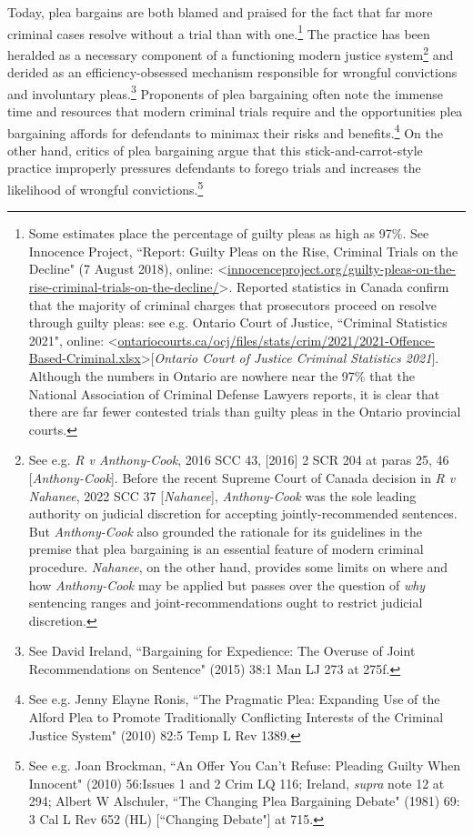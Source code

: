 Today, plea bargains are both blamed and praised for the fact that far more criminal cases resolve without a trial than with one.\footnote{Some estimates place the percentage of guilty pleas as high as 97\%. See Innocence Project, ``Report: Guilty Pleas on the Rise, Criminal Trials on the Decline" (7 August 2018), online: \textless \url{innocenceproject.org/guilty-pleas-on-the-rise-criminal-trials-on-the-decline/}\textgreater. Reported statistics in Canada confirm that the majority of criminal charges that prosecutors proceed on resolve through guilty pleas: see e.g. Ontario Court of Justice, ``Criminal Statistics 2021", online: \textless \url{ontariocourts.ca/ocj/files/stats/crim/2021/2021-Offence-Based-Criminal.xlsx}\textgreater \hspace{1mm}[\textit{Ontario Court of Justice Criminal Statistics 2021}]. Although the numbers in Ontario are nowhere near the 97\% that the National Association of Criminal Defense Lawyers reports, it is clear that there are far fewer contested trials than guilty pleas in the Ontario provincial courts.} The practice has been heralded as a necessary component of a functioning modern justice system\footnote{See e.g. \textit{R v Anthony-Cook}, 2016 SCC 43, [2016] 2 SCR 204 at paras 25, 46 [\textit{Anthony-Cook}]. Before the recent Supreme Court of Canada decision in \textit{R v Nahanee}, 2022 SCC 37 [\textit{Nahanee}], \textit{Anthony-Cook} was the sole leading authority on judicial discretion for accepting jointly-recommended sentences. But \textit{Anthony-Cook} also grounded the rationale for its guidelines in the premise that plea bargaining is an essential feature of modern criminal procedure. \textit{Nahanee}, on the other hand, provides some limits on where and how \textit{Anthony-Cook} may be applied but passes over the question of \textit{why} sentencing ranges and joint-recommendations ought to restrict judicial discretion.} and derided as an efficiency-obsessed mechanism responsible for wrongful convictions and involuntary pleas.\footnote{See David Ireland, ``Bargaining for Expedience: The Overuse of Joint Recommendations on Sentence" (2015) 38:1 Man LJ 273 at 275f.} Proponents of plea bargaining often note the immense time and resources that modern criminal trials require and the opportunities plea bargaining affords for defendants to minimax their risks and benefits.\footnote{See e.g. Jenny Elayne Ronis, ``The Pragmatic Plea: Expanding Use of the Alford Plea to Promote Traditionally Conflicting Interests of the Criminal Justice System" (2010) 82:5 Temp L Rev 1389.} On the other hand, critics of plea bargaining argue that this stick-and-carrot-style practice improperly pressures defendants to forego trials and increases the likelihood of wrongful convictions.\footnote{See e.g. Joan Brockman, ``An Offer You Can't Refuse: Pleading Guilty When Innocent" (2010) 56:Issues 1 and 2 Crim LQ 116; Ireland, \textit{supra} note 12 at 294; Albert W Alschuler, ``The Changing Plea Bargaining Debate" (1981) 69: 3 Cal L Rev 652 (HL) [``Changing Debate"] at 715.}

